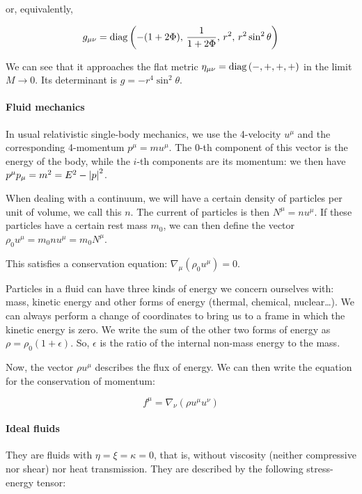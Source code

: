 \documentclass[main.tex]{subfiles}
\begin{document}
or, equivalently,

\begin{equation}
    g_{\mu\nu} =  \diag\qty(-(1+2\Phi),\, \frac{1}{1+2\Phi},\, r^2,\, r^2 \sin ^2 \theta )
\end{equation}

We can see that it approaches the flat metric $\eta_{\mu\nu} = \operatorname{diag}\qty(-, +, +, +)$ in the limit $M\rightarrow 0$. Its determinant is $g = -r^4 \sin^2 \theta$.

\paragraph{Fluid mechanics}

In usual relativistic single-body mechanics, we use the 4-velocity $u^\mu$ and the corresponding 4-momentum $p^\mu = m u^\mu$. The 0-th component of this vector is the energy of the body, while the $i$-th components are its momentum: we then have $p^\mu p_\mu = m^2 = E^2 - \abs{p}^2$.

When dealing with a continuum, we will have a certain density of particles per unit of volume, we call this $n$. The current of particles is then $N^\mu = n u^\mu$. If these particles have a certain rest mass $m_0$, we can then define the vector $\rho_0 u^\mu = m_0 n u^\mu = m_0 N^\mu$.

This satisfies a conservation equation: $\nabla_\mu(\rho_0 u^\mu) = 0$.

Particles in a fluid can have three kinds of energy we concern ourselves with: mass, kinetic energy and other forms of energy (thermal, chemical, nuclear\dots).
We can always perform a change of coordinates to bring us to a frame in which the kinetic energy is zero. We write the sum of the other two forms of energy as $\rho = \rho_0 (1+\epsilon)$. So, $\epsilon$ is the ratio of the internal non-mass energy to the mass.

Now, the vector $\rho u^\mu$ describes the flux of energy.
We can then write the equation for the conservation of momentum:

\begin{equation}
    f^\mu = \nabla_\nu (\rho u^\mu u^\nu)
\end{equation}

\paragraph{Ideal fluids}

They are fluids with \(\eta=\xi=\kappa=0\), that is, without viscosity (neither compressive nor shear) nor heat transmission.
They are described by the following stress-energy tensor:
\end{document}
